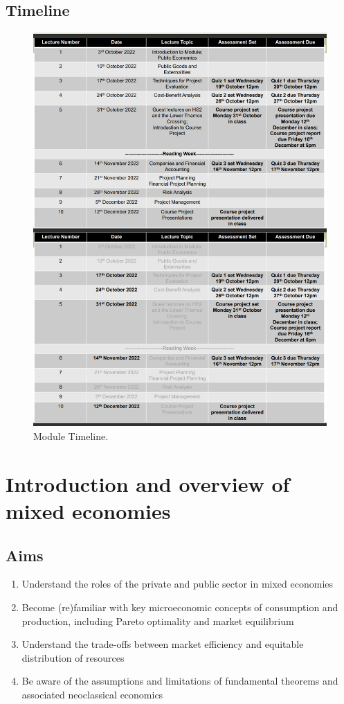 \documentclass[class=report, crop=false, 12pt,a4paper]{standalone}
\begin{document}
\subsection{Timeline}
\begin{figure}[H]
	\centering
	\includegraphics[width = 0.9 \textwidth]{../img/figure2.png}
	\caption{Module Timeline.}
\end{figure}
\section{Introduction and overview of mixed economies}
\subsection{Aims}
\begin{enumerate}
	\item Understand the roles of the private and public sector in mixed economies
	\item Become (re)familiar with key microeconomic concepts of consumption and production, including Pareto optimality and market equilibrium
	\item Understand the trade-offs between market efficiency and equitable distribution of resources
	\item Be aware of the assumptions and limitations of fundamental theorems and associated neoclassical economics
\end{enumerate}
\end{document}
